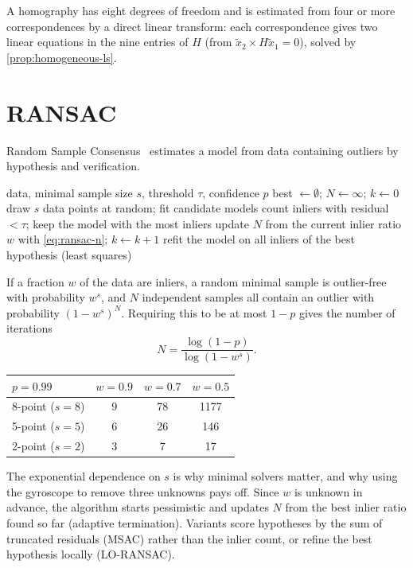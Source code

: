 A homography has eight degrees of freedom and is estimated from four or more correspondences by a direct linear transform: each correspondence gives two linear
equations in the nine entries of $H$ (from $\tilde x_2\times H\tilde x_1 = 0$), solved by \cref{prop:homogeneous-ls}.

\section{RANSAC}

Random Sample Consensus~\cite{fischler1981ransac} estimates a model from data containing outliers by hypothesis and verification.

\begin{algorithm}[h]
\caption{RANSAC}
\begin{algorithmic}[1]
\Require data, minimal sample size $s$, threshold $\tau$, confidence $p$
\State best $\gets \emptyset$; $N \gets \infty$; $k \gets 0$
  \State draw $s$ data points at random; fit candidate models
  \State count inliers with residual $< \tau$; keep the model with the most inliers
  \State update $N$ from the current inlier ratio $w$ with \eqref{eq:ransac-n}; $k \gets k + 1$
\EndWhile
\State refit the model on all inliers of the best hypothesis (least squares)
\end{algorithmic}
\end{algorithm}

If a fraction $w$ of the data are inliers, a random minimal sample is outlier-free with probability $w^s$, and $N$ independent samples all contain an outlier with probability
$(1 - w^s)^N$. Requiring this to be at most $1 - p$ gives the number of iterations
\begin{equation}
  N = \frac{\log(1 - p)}{\log(1 - w^s)} .
  \label{eq:ransac-n}
\end{equation}
\begin{center}\small
\begin{tabular}{@{}l c c c@{}}
\toprule
$p = 0.99$ & $w = 0.9$ & $w = 0.7$ & $w = 0.5$ \\
\midrule
8-point ($s = 8$) & 9 & 78 & 1177 \\
5-point ($s = 5$) & 6 & 26 & 146 \\
2-point ($s = 2$) & 3 & 7 & 17 \\
\bottomrule
\end{tabular}
\end{center}
The exponential dependence on $s$ is why minimal solvers matter, and why using the gyroscope to remove three unknowns pays off. Since $w$ is unknown in advance, the
algorithm starts pessimistic and updates $N$ from the best inlier ratio found so far (adaptive termination). Variants score hypotheses by the sum of truncated
residuals (MSAC) rather than the inlier count, or refine the best hypothesis locally (LO-RANSAC).

